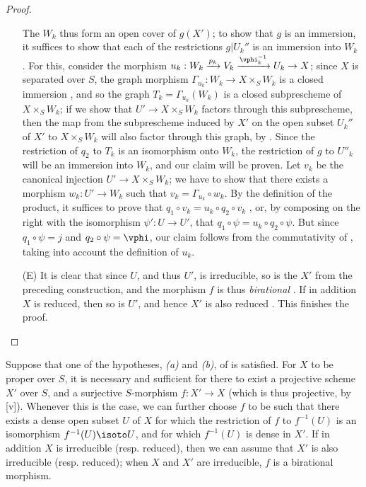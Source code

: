 \begin{proof}
\begin{enumerate}
    The $W_k$ thus form an open cover of $g(X')$; to show that $g$ is an immersion, it suffices to show that each of the restrictions $g|U_k''$ is an immersion into $W_k$ .
    For this, consider the morphism $u_k:W_k\xrightarrow{p_k}V_k\xrightarrow{\vphi_k^{-1}}U_k\to X$; since $X$ is separated over $S$, the graph morphism $\Gamma_{u_k}:W_k\to X\times_S W_k$ is a closed immersion , and so the graph $T_k=\Gamma_{u_k}(W_k)$ is a closed subprescheme of $X\times_S W_k$;
    if we show that $U'\to X\times_S W_k$ factors through this subprescheme, then the map from the subprescheme induced by $X'$ on the open subset $U_k''$ of $X'$ to $X\times_S W_k$ will also factor through this graph, by .
    Since the restriction of $q_2$ to $T_k$ is an isomorphism onto $W_k$, the restriction of $g$ to $U''_k$ will be an immersion into $W_k$, and our claim will be proven.
    Let $v_k$ be the canonical injection $U'\to X\times_S W_k$; we have to show that there exists a morphism $w_k:U'\to W_k$ such that $v_k=\Gamma_{u_k}\circ w_k$.
    By the definition of the product, it suffices to prove that $q_1\circ v_k=u_k\circ q_2\circ v_k$ , or, by composing on the right
    with the isomorphism $\psi':U\to U'$, that $q_1\circ\psi=u_k\circ q_2\circ\psi$.
    But since $q_1\circ\psi=j$ and $q_2\circ\psi=\vphi$, our claim follows from the commutativity of , taking into account the definition of $u_k$.
  \item[(E)] It is clear that since $U$, and thus $U'$, is irreducible, so is the $X'$ from the preceding construction, and the morphism $f$ is thus \emph{birational} .
    If in addition $X$ is reduced, then so is $U'$, and hence $X'$ is also reduced .
    This finishes the proof.
\end{enumerate}
\end{proof}

\begin{corollary}[5.6.2]
\label{II.5.6.2}
Suppose that one of the hypotheses, \emph{(a)} and \emph{(b)}, of  is satisfied.
For $X$ to be proper over $S$, it is necessary and sufficient for there to exist a projective scheme $X'$ over $S$, and a surjective $S$-morphism $f:X'\to X$ (which is thus projective, by [v]).
Whenever this is the case, we can further choose $f$ to be such that there exists a dense open subset $U$ of $X$ for which the restriction of $f$ to $f^{-1}(U)$ is an isomorphism $f^{-1}(U)\isoto U$, and for which $f^{-1}(U)$ is dense in $X'$.
If in addition $X$ is irreducible (resp. reduced), then we can assume that $X'$ is also irreducible (resp. reduced); when $X$ and $X'$ are irreducible, $f$ is a birational morphism.
\end{corollary}

